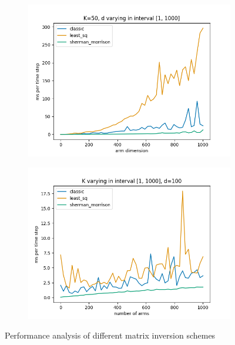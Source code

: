 \begin{figure}[H]
  \centering
  \begin{subfigure}[b]{0.45\textwidth}
      \centering
      \includegraphics[width=\textwidth]{plots/d_varying_time.png}
      \label{fig:plot1}
  \end{subfigure}
  \hfill
  \begin{subfigure}[b]{0.45\textwidth}
      \centering
      \includegraphics[width=\textwidth]{plots/K_varying_time.png}
      \label{fig:plot2}
  \end{subfigure}
  \label{fig:combined_plots}
  \caption{Performance analysis of different matrix inversion schemes}
\end{figure}

